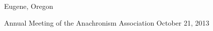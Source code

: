 

\vspace{1ex}

\begin{changemargin}{-0.3in}{0in}
\begin{etaremune}

\item
\headedsection %
{}
{Eugene, Oregon} {

\headedsubsection %
{Annual Meeting of the Anachronism Association}
{October 21, 2013}
{%
}
}

\end{etaremune}
\end{changemargin}


\spacedhrule{0.5em}{-0.4em} %
